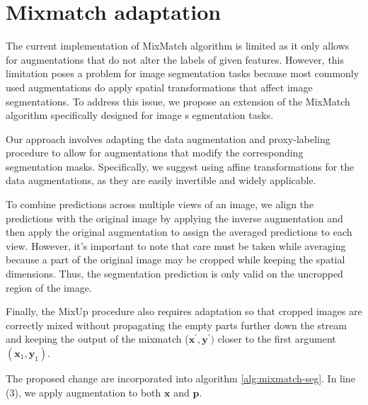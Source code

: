 \section{Mixmatch adaptation}
The current implementation of MixMatch algorithm is limited as it only allows for augmentations that do not alter the labels of given features. 
However, this limitation poses a problem for image segmentation tasks because most commonly used augmentations do apply spatial transformations 
that affect image segmentations. To address this issue, we propose an extension of the MixMatch algorithm specifically designed for image s
egmentation tasks.

Our approach involves adapting the data augmentation and proxy-labeling procedure to allow for augmentations that modify the corresponding 
segmentation masks. Specifically, we suggest using affine transformations for the data augmentations, as they are easily invertible and widely
applicable.

To combine predictions across multiple views of an image, we align the predictions with the original image by applying the inverse augmentation
and then apply the original augmentation to assign the averaged predictions to each view. However, it's important to note that care must be taken
while averaging because a part of the original image may be cropped while keeping the spatial dimensions. Thus, the segmentation prediction is 
only valid on the uncropped region of the image.

Finally, the MixUp procedure also requires adaptation so that cropped images are correctly mixed without propagating the empty parts 
further down the stream and keeping the output of the mixmatch ($\mathbf{x}^\prime,\mathbf{y}^\prime)$ closer to the first argument $(\mathbf{x}_1,\mathbf{y}_1)$.  

The proposed change are incorporated into algorithm \ref{alg:mixmatch-seg}. In line (3), we apply augmentation to both $\mathbf{x}$ and $\mathbf{p}$.

